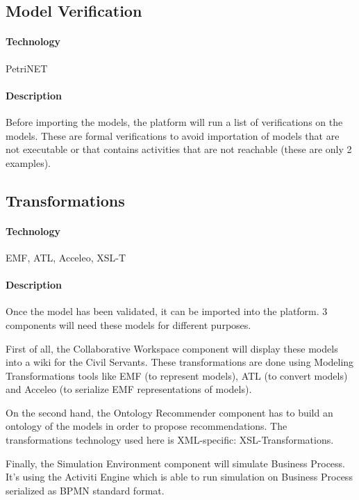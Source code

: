 \documentclass{learnpad}
\begin{document}
\subsection{Model Verification}
\label{sec:model-verification}

\paragraph{Technology}
PetriNET

\paragraph{Description}
Before importing the models, the \learnpad platform will run a list of
verifications on the models.  These are formal verifications to avoid
importation of models that are not executable or that contains activities that
are not reachable (these are only 2 examples).

\subsection{Transformations}
\label{sec:transformations}

\paragraph{Technology}
EMF, ATL, Acceleo, XSL-T

\paragraph{Description}
Once the model has been validated, it can be imported into the \learnpad
platform.  3 components will need these models for different purposes.

First of all, the Collaborative Workspace component will display these models
into a wiki for the Civil Servants.  These transformations are done using
Modeling Transformations tools like EMF (to represent models), ATL (to convert
models) and Acceleo (to serialize EMF representations of models).

On the second hand, the Ontology Recommender component has to build an ontology
of the models in order to propose recommendations.  The transformations
technology used here is XML-specific: XSL-Transformations.

Finally, the Simulation Environment component will simulate Business Process.
It's using the Activiti Engine which is able to run simulation on Business
Process serialized as BPMN standard format.
\end{document}
